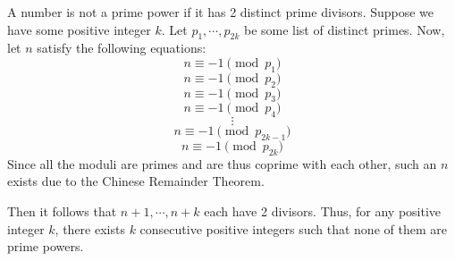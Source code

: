 \documentclass[11pt]{article}
\begin{document}
\begin{solution}
A number is not a prime power if it has 2 distinct prime divisors.
Suppose we have some positive integer $k$.
Let $p_1,\cdots,p_{2k}$ be some list of distinct primes.
Now, let $n$ satisfy the following equations:
$$n\equiv-1\pmod{p_1}$$
$$n\equiv-1\pmod{p_2}$$
$$n\equiv-1\pmod{p_3}$$
$$n\equiv-1\pmod{p_4}$$
$$\vdots$$
$$n\equiv-1\pmod{p_{2k-1}}$$
$$n\equiv-1\pmod{p_{2k}}$$
Since all the moduli are primes and are thus coprime with each other,
such an $n$ exists due to the Chinese Remainder Theorem.

Then it follows that $n+1,\cdots,n+k$ each have 2 divisors.
Thus, for any positive integer $k$, there exists $k$ consecutive positive integers such that none of them are prime powers.
\end{solution}
\end{document}
